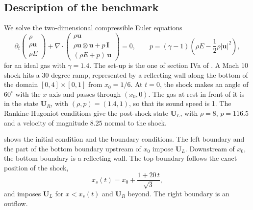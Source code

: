 

\subsection{Description of the benchmark}

We solve the two-dimensional compressible Euler equations
\begin{equation}\label{eq:specs:samurai:euler}
  \partial_t
  \begin{pmatrix} \rho \\ \rho \mathbf{u} \\ \rho E \end{pmatrix}
  + \nabla\cdot
  \begin{pmatrix} \rho \mathbf{u} \\ \rho \mathbf{u}\otimes\mathbf{u} + p\,\mathbf{I} \\ (\rho E + p)\,\mathbf{u} \end{pmatrix}
  = 0,
  \qquad
  p = (\gamma - 1)\left(\rho E - \frac{1}{2}\rho |\mathbf{u}|^2\right),
\end{equation}
for an ideal gas with $\gamma = 1.4$. The set-up is the one of section IVa of
. A Mach 10 shock hits a
30 degree ramp, represented by a reflecting wall along the bottom of the domain
$[0,4]\times[0,1]$ from $x_0 = 1/6$. At $t = 0$, the shock makes an angle of
$60^\circ$ with the $x$-axis and passes through $(x_0, 0)$. The gas at rest in
front of it is in the state $\mathbf{U}_R$, with $(\rho, p) = (1.4, 1)$, so
that its sound speed is 1. The Rankine-Hugoniot conditions give the post-shock
state $\mathbf{U}_L$, with $\rho = 8$, $p = 116.5$ and a velocity of magnitude
$8.25$ normal to the shock.

 shows the initial condition and the boundary
conditions. The left boundary and the part of the bottom boundary upstream of
$x_0$ impose $\mathbf{U}_L$. Downstream of $x_0$, the bottom boundary is a
reflecting wall. The top boundary follows the exact position of the shock,
\begin{equation}\label{eq:specs:samurai:dmr:shock}
  x_s(t) = x_0 + \frac{1 + 20\,t}{\sqrt{3}},
\end{equation}
and imposes $\mathbf{U}_L$ for $x < x_s(t)$ and $\mathbf{U}_R$ beyond. The right
boundary is an outflow.

